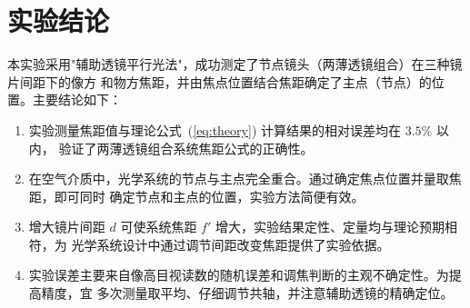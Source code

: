 \documentclass[12pt, a4paper]{article}
\begin{document}
\section{实验结论}

本实验采用"辅助透镜平行光法"，成功测定了节点镜头（两薄透镜组合）在三种镜片间距下的像方
和物方焦距，并由焦点位置结合焦距确定了主点（节点）的位置。主要结论如下：

\begin{enumerate}
  \item 实验测量焦距值与理论公式~(\ref{eq:theory}) 计算结果的相对误差均在 $3.5\%$ 以内，
        验证了两薄透镜组合系统焦距公式的正确性。

  \item 在空气介质中，光学系统的节点与主点完全重合。通过确定焦点位置并量取焦距，即可同时
        确定节点和主点的位置，实验方法简便有效。

  \item 增大镜片间距 $d$ 可使系统焦距 $f'$ 增大，实验结果定性、定量均与理论预期相符，为
        光学系统设计中通过调节间距改变焦距提供了实验依据。

  \item 实验误差主要来自像高目视读数的随机误差和调焦判断的主观不确定性。为提高精度，宜
        多次测量取平均、仔细调节共轴，并注意辅助透镜的精确定位。
\end{enumerate}
\end{document}
